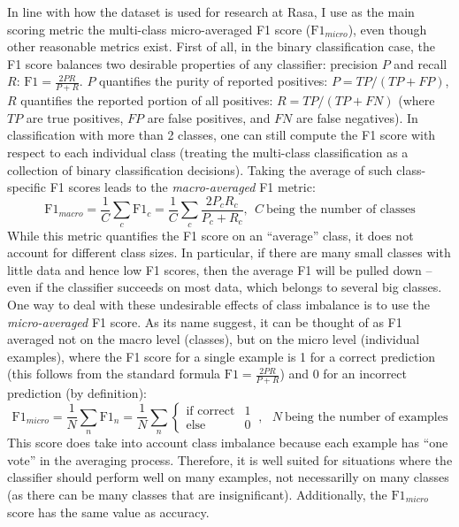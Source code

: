 \documentclass[bsc,frontabs,twoside,singlespacing,parskip,deptreport]{infthesis}
\begin{document}
{{{      In line with how the dataset is used for research at Rasa, I use as the main scoring metric the multi-class micro-averaged F1 score ($\text{F1}_{micro}$), even though other reasonable metrics exist. First of all, in the binary classification case, the F1 score balances two desirable properties of any classifier: precision $P$ and recall $R$: $\text{F1} = \frac{2 P R}{P+R}$.
      $P$ quantifies the purity of reported positives: $P=TP/(TP+FP)$, $R$ quantifies the reported portion of all positives: $R=TP/(TP+FN)$ (where $TP$ are true positives, $FP$ are false positives, and $FN$ are false negatives).
      In classification with more than 2 classes, one can still compute the F1 score with respect to each individual class (treating the multi-class classification as a collection of binary classification decisions). Taking the average of such class-specific F1 scores leads to the \textit{macro-averaged} F1 metric:
      \begin{equation}
        \text{F1}_{macro} = \frac{1}{C}\sum_c \text{F1}_c = \frac{1}{C}\sum_c \frac{2 P_c R_c}{P_c+R_c}, \ \  C\ \text{being the number of classes}
      \end{equation}
      While this metric quantifies the F1 score on an ``average'' class, it does not account for different class sizes. In particular, if there are many small classes with little data and hence low F1 scores, then the average F1 will be pulled down -- even if the classifier succeeds on most data, which belongs to several big classes.
      One way to deal with these undesirable effects of class imbalance is to use the \textit{micro-averaged} F1 score. As its name suggest, it can be thought of as F1 averaged not on the macro level (classes), but on the micro level (individual examples), where the F1 score for a single example is 1 for a correct prediction (this follows from the standard formula $\text{F1} = \frac{2 P R}{P+R}$) and 0 for an incorrect prediction (by definition):
      \begin{equation}
        \text{F1}_{micro} = \frac{1}{N}\sum_n \text{F1}_n = \frac{1}{N}\sum_n {\begin{cases}\text{if correct} & 1\\ \text{else} & 0\end{cases}}\ ,\ \ \  N\ \text{being the number of examples}
      \end{equation}
      This score does take into account class imbalance because each example has ``one vote'' in the averaging process. Therefore, it is well suited for situations where the classifier should perform well on many examples, not necessarilly on many classes (as there can be many classes that are insignificant).
      Additionally, the $\text{F1}_{micro}$ score has the same value as accuracy.
    }
  }

}
\end{document}
